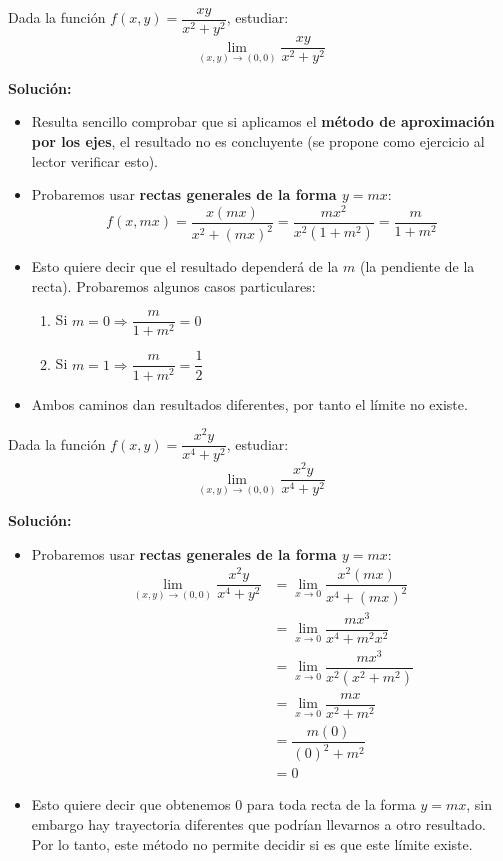 \begin{ejemplo}
Dada la función $f(x,y)=\dfrac{xy}{x^2+y^2}$, estudiar:
\[
\lim_{(x,y)\to(0,0)}\dfrac{xy}{x^2+y^2}
\]
\end{ejemplo}
\textbf{Solución:}
\begin{itemize}
    \item Resulta sencillo comprobar que si aplicamos el \textbf{método de aproximación por los ejes}, el resultado no es concluyente (se propone como ejercicio al lector verificar esto).
    \item Probaremos usar \textbf{rectas generales de la forma $y=mx$}:
    \[
    f(x,mx)=\dfrac{x(mx)}{x^2+(mx)^2}=\dfrac{mx^2}{x^2(1+m^2)}=\dfrac{m}{1+m^2}
    \]
    \item Esto quiere decir que el resultado dependerá de la $m$ (la pendiente de la recta). Probaremos algunos casos particulares:
    \begin{enumerate}
        \item[-] Si $m=0 \Rightarrow \dfrac{m}{1+m^2}=0$
        \item[-] Si $m=1 \Rightarrow \dfrac{m}{1+m^2}=\dfrac{1}{2}$
    \end{enumerate}
    \item Ambos caminos dan resultados diferentes, por tanto el límite no existe.
\end{itemize}

\begin{ejemplo}
Dada la función $f(x,y)=\dfrac{x^2y}{x^4+y^2}$, estudiar:
\[
\lim_{(x,y)\to(0,0)}\dfrac{x^2y}{x^4+y^2}
\]
\end{ejemplo}
\textbf{Solución:}
\begin{itemize}
    \item Probaremos usar \textbf{rectas generales de la forma $y=mx$}:
        \begin{align*}
        \lim_{(x,y)\to(0,0)}\dfrac{x^2y}{x^4+y^2} &=\lim_{x\to 0}\dfrac{x^2(mx)}{x^4+(mx)^2} \\
        &=\lim_{x\to 0} \dfrac{mx^3}{x^4+m^2x^2}\\
        &=\lim_{x\to 0} \dfrac{mx^3}{x^2(x^2+m^2)}\\
        &=\lim_{x\to 0} \dfrac{mx}{x^2+m^2}\\
        &=\dfrac{m(0)}{(0)^2+m^2}\\
        &=0
        \end{align*}
    \item Esto quiere decir que obtenemos 0 para toda recta de la forma $y=mx$, sin embargo hay trayectoria diferentes que podrían llevarnos a otro resultado. Por lo tanto, este método no permite decidir si es que este límite existe.
\end{itemize}

